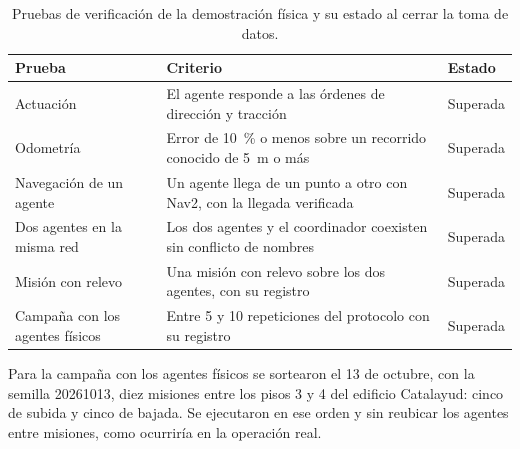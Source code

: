 \begin{table}[htbp]
  \centering\small
  \caption{Pruebas de verificación de la demostración física y su estado al
    cerrar la toma de datos.}
  \label{tab:pruebas-verificacion}
  \begin{tabular}{@{}p{}p{}p{}@{}}
    \toprule
    \textbf{Prueba} & \textbf{Criterio} & \textbf{Estado} \\ \midrule
    Actuación & El agente responde a las órdenes de dirección y tracción & Superada \\ \addlinespace
    Odometría & Error de 10~\% o menos sobre un recorrido conocido de 5~m o más & Superada \\ \addlinespace
    Navegación de un agente & Un agente llega de un punto a otro con Nav2, con la llegada verificada & Superada \\ \addlinespace
    Dos agentes en la misma red & Los dos agentes y el coordinador coexisten sin conflicto de nombres & Superada \\ \addlinespace
    Misión con relevo & Una misión con relevo sobre los dos agentes, con su registro & Superada \\ \addlinespace
    Campaña con los agentes físicos & Entre 5 y 10 repeticiones del protocolo con su registro & Superada \\ \bottomrule
  \end{tabular}
\end{table}

Para la campaña con los agentes físicos se sortearon el 13 de octubre, con la semilla 20261013, diez misiones entre los pisos 3 y 4 del edificio Catalayud: cinco de subida y cinco de bajada. Se ejecutaron en ese orden y sin reubicar los agentes entre misiones, como ocurriría en la operación real.
